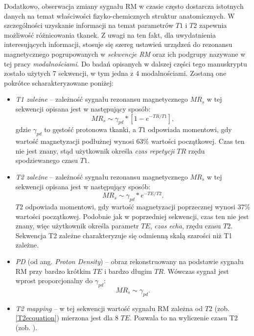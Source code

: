 Dodatkowo, obserwacja zmiany sygnału RM w czasie często dostarcza istotnych danych na temat właściwości fizyko-chemicznych struktur anatomicznych. W szczególności uzyskanie informacji na temat parametrów $T1$ i $T2$ zapewnia możliwość różnicowania tkanek. Z uwagi na ten fakt, dla uwydatnienia interesujących informacji, stosuje się szereg ustawień urządzeń do rezonansu magnetycznego pogrupowanych w \textit{sekwencje RM} oraz ich podgrupy nazywane w tej pracy \textit{modalnościami}. \linebreak Do badań opisanych w dalszej części tego manuskryptu zostało użytych 7 sekwencji, w tym jedna z 4 modalnościami. Zostaną one pokrótce scharakteryzowane poniżej:
\begin{itemize}[noitemsep,nolistsep]
	\item \textit{T1 zależne} -- zależność sygnału rezonansu magnetycznego $MR_s$ w tej sekwencji opisana jest w następujący sposób: 
	\begin{equation}
		MR_s \sim \gamma_{pd} \ast [1-e^{-TR/T1}],
	\end{equation}
	gdzie $\gamma_{pd}$ to gęstość protonowa tkanki, a $T1$ odpowiada momentowi, gdy wartość magnetyzacji podłużnej wynosi 63\% wartości początkowej. Czas ten nie jest znany, stąd użytkownik określa \textit{czas repetycji} $TR$ rzędu spodziewanego czasu $T1$.
	\item \textit{T2 zależne} -- zależność sygnału rezonansu magnetycznego $MR_s$ w tej sekwencji opisana jest w następujący sposób: 
	\begin{equation}
	\label{T2ecquation}
	MR_s \sim \gamma_{pd} \ast e^{-TE/T2}.
	\end{equation}
	$T2$ odpowiada momentowi, gdy wartość magnetyzacji poprzecznej wynosi 37\% wartości początkowej. Podobnie jak w poprzedniej sekwencji, czas ten nie jest znany, więc użytkownik określa parametr $TE$, \textit{czas echa}, rzędu czasu $T2$. Sekwencja T2 zależne charakteryzuje się odmienną skalą szarości niż T1 zależne.
	\item \textit{PD} (od ang. \textit{Proton Density}) -- obraz rekonstruowany na podstawie sygnału RM przy bardzo krótkim $TE$ i bardzo długim $TR$. Wówczas sygnał jest wprost proporcjonalny do $\gamma_{pd}$:
	\begin{equation}
	MR_s \sim \gamma_{pd}.
	\end{equation}
	\item \textit{T2 mapping} -- w tej sekwencji wartość sygnału RM zależna od $T2$ (zob. \ref{T2ecquation}) mierzona jest dla 8 $TE$. Pozwala to na wyliczenie czasu T2 (zob. \cite{Regulski2017}).

\end{itemize}
